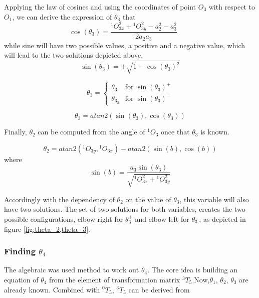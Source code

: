 \documentclass{article}
\renewcommand{\c}[1]{\cos(\theta_{#1})}
\newcommand{\s}[1]{\sin(\theta_{#1})}
\newcommand{\T}[2]{{}^{#1}T_{#2}}
\renewcommand{\O}[2]{{}^{#1}O_{#2}}
\begin{document}
Applying the law of cosines and using the coordinates of point $O_3$ with respect to $O_1$, we can derive the expression of $\theta_3$ that
\begin{equation*}
\c{3} = \frac{\O{1}{3x}^2 + \O{1}{3y}^2 - a_2^2 - a_3^2}{2a_2a_3}\qquad
\end{equation*}
while sine will have two possible values, a positive and a negative value, which will lead to the two solutions depicted above.
\begin{equation*}
\s{3} = \pm\sqrt{1-\c{3}^2}
\end{equation*}

\begin{equation*}
\theta_{3} = \begin{cases} 
   \theta_{3_1} & \text{for } {\s{3}}^+ \\
   \theta_{3_2} & \text{for } {\s{3}}^-
  \end{cases}
\end{equation*}

\begin{equation}
\theta_{3} = atan2(\s{3},\c{3})
\end{equation}

Finally, $\theta_2$ can be computed from the angle of $\O{1}{3}$ once that $\theta_3$ is known.

\begin{equation}
\theta_{2} = atan2(\O{1}{3y},\O{1}{3x})-atan2(\sin(b),\cos(b) )
\end{equation}
where
\begin{equation*}
\sin(b)= \frac{a_3\s{3}}{\sqrt{\O{1}{3x}^2+\O{1}{3y}^2}}
\end{equation*}

Accordingly with the dependency of $\theta_2$ on the value of $\theta_3$, this variable will also have two solutions. The set of two solutions for both variables, creates the two possible configurations, elbow right for $\theta_3^+$ and elbow left for $\theta_3^-$, as depicted in figure \ref{fig:theta_2,theta_3}.

\subsubsection{Finding $\theta_4$}
The algebraic was used method to work out $\theta_4$. The core idea is building an equation of $\theta_4$ from the element of transformation matrix $\T{3}{5}$.Now,$\theta_1$, $\theta_2$, $\theta_3$ are already known. Combined with  $\T{0}{5}$,  $\T{3}{5}$ can be derived from
\end{document}
